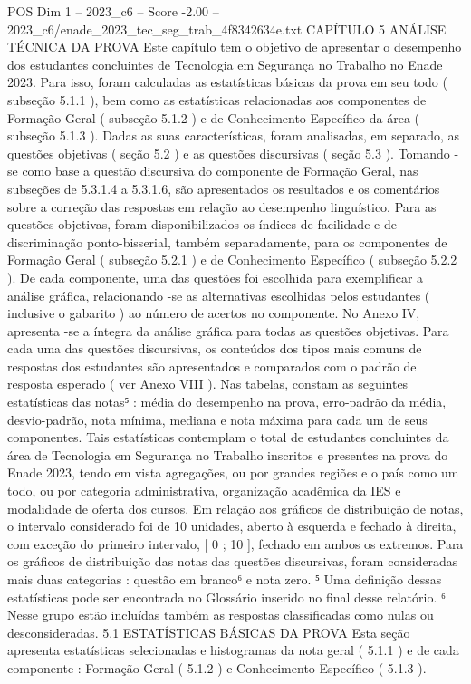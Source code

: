 \begin{textsample}{POS Dim 1 – 2023\_c6 – Score -2.00 – 2023\_c6/enade\_2023\_tec\_seg\_trab\_4f8342634e.txt}  \label{ex:f1_pos_239}
CAPÍTULO 5 ANÁLISE TÉCNICA DA PROVA Este capítulo tem o objetivo de apresentar o desempenho dos estudantes concluintes de Tecnologia em Segurança no Trabalho no Enade 2023.
Para isso, foram calculadas as estatísticas básicas da prova em seu todo ( subseção 5.1.1 ), bem como as estatísticas relacionadas aos componentes de Formação Geral ( subseção 5.1.2 ) e de Conhecimento Específico da área ( subseção 5.1.3 ).
Dadas as suas características, foram analisadas, em separado, as questões objetivas ( seção 5.2 ) e as questões discursivas ( seção 5.3 ).
Tomando -se como base a questão discursiva do componente de Formação Geral, nas subseções de 5.3.1.4 a 5.3.1.6, são apresentados os resultados e os comentários sobre a correção das respostas em relação ao desempenho linguístico.
Para as questões objetivas, foram disponibilizados os índices de facilidade e de discriminação ponto-bisserial, também separadamente, para os componentes de Formação Geral ( subseção 5.2.1 ) e de Conhecimento Específico ( subseção 5.2.2 ).
De cada componente, uma das questões foi escolhida para exemplificar a análise gráfica, relacionando -se as alternativas escolhidas pelos estudantes ( inclusive o gabarito ) ao número de acertos no componente.
No Anexo IV, apresenta -se a íntegra da análise gráfica para todas as questões objetivas.
Para cada uma das questões discursivas, os conteúdos dos tipos mais comuns de respostas dos estudantes são apresentados e comparados com o padrão de resposta esperado ( ver Anexo VIII ).
Nas tabelas, constam as seguintes estatísticas das notas⁵ : média do desempenho na prova, erro-padrão da média, desvio-padrão, nota mínima, mediana e nota máxima para cada um de seus componentes.
Tais estatísticas contemplam o total de estudantes concluintes da área de Tecnologia em Segurança no Trabalho inscritos e presentes na prova do Enade 2023, tendo em vista agregações, ou por grandes regiões e o país como um todo, ou por categoria administrativa, organização acadêmica da IES e modalidade de oferta dos cursos.
Em relação aos gráficos de distribuição de notas, o intervalo considerado foi de 10 unidades, aberto à esquerda e fechado à direita, com exceção do primeiro intervalo, [ 0 ; 10 ], fechado em ambos os extremos.
Para os gráficos de distribuição das notas das questões discursivas, foram consideradas mais duas categorias : questão em branco⁶ e nota zero. ⁵ Uma definição dessas estatísticas pode ser encontrada no Glossário inserido no final desse relatório. ⁶ Nesse grupo estão incluídas também as respostas classificadas como nulas ou desconsideradas. 5.1 ESTATÍSTICAS BÁSICAS DA PROVA Esta seção apresenta estatísticas selecionadas e histogramas da nota geral ( 5.1.1 ) e de cada componente : Formação Geral ( 5.1.2 ) e Conhecimento Específico ( 5.1.3 ).

\end{textsample}
